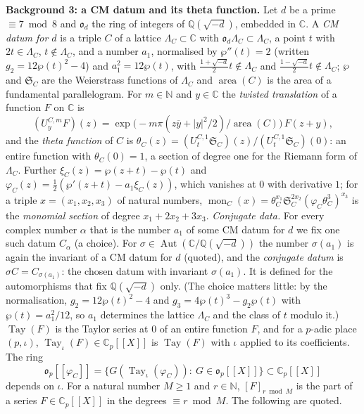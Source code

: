 \documentclass[11pt,a4paper]{article}
\newcommand{\Q}{\mathbb{Q}}
\newcommand{\subhead}[1]{\par\addvspace{9pt plus 2pt}\Needspace{4\baselineskip}\noindent\textbf{#1}\enspace\ignorespaces}
\theoremstyle{plainx}
\theoremstyle{uprightx}
\newcommand{\CC}{\mathbb{C}}
\newcommand{\NN}{\mathbb{N}}
\newcommand{\Cp}{\CC_p}
\newcommand{\op}{\mathfrak{o}_p}
\newcommand{\cj}[1]{\overline{#1}}
\newcommand{\Aut}{\operatorname{Aut}}
\newcommand{\OO}{\mathfrak{o}}
\newcommand{\LamC}[1]{\Lambda_{#1}}
\newcommand{\thC}[1]{\theta_{#1}}
\newcommand{\xiC}[1]{\xi_{#1}}
\newcommand{\phC}[1]{\varphi_{#1}}
\newcommand{\UC}[3]{U^{#1,#2}_{#3}}
\newcommand{\tay}[1]{\operatorname{Tay}(#1)}
\newcommand{\tayj}[1]{\operatorname{Tay}_\iota(#1)}
\newcommand{\phiring}[1]{\op[[\phC{#1}]]}
\newcommand{\area}[1]{\operatorname{area}(#1)}
\newcommand{\mon}[2]{\operatorname{mon}_{#1}(#2)}
\newcommand{\cpart}[3]{[#3]_{#2\bmod #1}}
\begin{document}
\subhead{Background 3: a CM datum and its theta function.} Let $d$ be a prime $\equiv7\bmod8$ and $\OO_d$ the
ring of integers of $\Q(\sqrt{-d})$, embedded in $\CC$. A \emph{CM datum for $d$} is a triple $C$ of a lattice
$\LamC{C}\subset\CC$ with $\OO_d\LamC{C}\subset\LamC{C}$, a point $t$ with $2t\in\LamC{C}$, $t\notin\LamC{C}$, and a
number $a_1$, normalised by $\wp''(t)=2$ (written $g_2=12\wp(t)^2-4$) and $a_1^2=12\wp(t)$, with
$\frac{1+\sqrt{-d}}2t\notin\LamC{C}$ and $\frac{1-\sqrt{-d}}2t\notin\LamC{C}$; $\wp$ and $\mathfrak{S}_C$ are the Weierstrass functions of
$\LamC{C}$ and $\area{C}$ is the area of a fundamental parallelogram. For $m\in\NN$ and $y\in\CC$ the \emph{twisted
translation} of a function $F$ on $\CC$ is
\[(\UC{C}{m}{y}F)(z)=\exp\bigl(-m\pi(z\cj{y}+|y|^2/2)/\area{C}\bigr)\,F(z+y),\]
and the \emph{theta function} of $C$ is $\thC{C}(z)=(\UC{C}{1}{t}\mathfrak{S}_C)(z)/(\UC{C}{1}{t}\mathfrak{S}_C)(0)$: an entire
function with $\thC{C}(0)=1$, a section of degree one for the Riemann form of $\LamC{C}$. Further
$\xiC{C}(z)=\wp(z+t)-\wp(t)$ and $\phC{C}(z)=\tfrac12(\wp'(z+t)-a_1\xiC{C}(z))$, which vanishes at $0$ with
derivative $1$; for a triple $x=(x_1,x_2,x_3)$ of natural numbers,
$\mon{C}{x}=\thC{C}^{x_1}\mathfrak{S}_C^{2x_2}(\phC{C}\thC{C}^3)^{x_3}$ is the \emph{monomial section} of degree
$x_1+2x_2+3x_3$. \emph{Conjugate data.} For every complex number $\alpha$ that is the number $a_1$
of some CM datum for $d$ we fix one such datum $C_\alpha$ (a choice). For
$\sigma\in\Aut(\CC/\Q(\sqrt{-d}))$ the number $\sigma(a_1)$ is again the invariant of a CM datum for $d$
(quoted), and the \emph{conjugate datum} is $\sigma C=C_{\sigma(a_1)}$: the chosen datum with invariant
$\sigma(a_1)$. It is defined for the automorphisms that fix $\Q(\sqrt{-d})$ only. (The choice matters
little: by the normalisation, $g_2=12\wp(t)^2-4$ and $g_3=4\wp(t)^3-g_2\wp(t)$ with $\wp(t)=a_1^2/12$, so
$a_1$ determines the lattice $\LamC{C}$ and the class of $t$ modulo it.) $\tay{F}$ is the
Taylor series at $0$ of an entire function $F$, and for a $p$-adic place $(p,\iota)$, $\tayj{F}\in\Cp[[X]]$ is $\tay{F}$
with $\iota$ applied to its coefficients. The ring
\[\phiring{C}=\{G(\tayj{\phC{C}}):\ G\in\op[[X]]\}\subset\Cp[[X]]\]
depends on $\iota$. For a natural number $M\ge1$ and $r\in\NN$, $\cpart{M}{r}{F}$ is the part of a series $F\in\Cp[[X]]$
in the degrees $\equiv r\bmod M$. The following are quoted.
\end{document}
